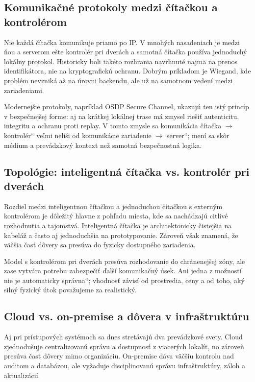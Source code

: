 \documentclass[journal,a4paper,onecolumn]{IEEEtran}
\newcommand{\uv}[1]{\quotedblbase#1\textquotedblleft}
\begin{document}
\subsection{Komunikačné protokoly medzi čítačkou a kontrolérom}

Nie každá čítačka komunikuje priamo po IP. V mnohých nasadeniach je medzi ňou a serverom ešte kontrolér pri dverách a samotná čítačka používa jednoduchý lokálny protokol. Historicky boli takéto rozhrania navrhnuté najmä na prenos identifikátora, nie na kryptografickú ochranu. Dobrým príkladom je Wiegand, kde problém nevzniká až na úrovni backendu, ale už na samotnom vedení medzi zariadeniami.

Modernejšie protokoly, napríklad OSDP Secure Channel, ukazujú ten istý princíp v bezpečnejšej forme: aj na krátkej lokálnej trase má zmysel riešiť autenticitu, integritu a ochranu proti replay. V tomto zmysle sa komunikácia \uv{čítačka $\rightarrow$ kontrolér} veľmi nelíši od komunikácie \uv{zariadenie $\rightarrow$ server}; mení sa skôr médium a prevádzkový kontext než samotná bezpečnostná logika.

\subsection{Topológie: inteligentná čítačka vs. kontrolér pri dverách}

Rozdiel medzi inteligentnou čítačkou a jednoduchou čítačkou s externým kontrolérom je dôležitý hlavne z pohľadu miesta, kde sa nachádzajú citlivé rozhodnutia a tajomstvá. Inteligentná čítačka je architektonicky čistejšia na kabeláž a často aj jednoduchšia na prototypovanie. Zároveň však znamená, že väčšia časť dôvery sa presúva do fyzicky dostupného zariadenia.

Model s kontrolérom pri dverách presúva rozhodovanie do chránenejšej zóny, ale zase vytvára potrebu zabezpečiť ďalší komunikačný úsek. Ani jedna z možností nie je automaticky \uv{správna}; vhodnosť závisí od prostredia, ceny a od toho, aký silný fyzický útok považujeme za realistický.

\subsection{Cloud vs. on-premise a dôvera v infraštruktúru}

Aj pri prístupových systémoch sa dnes stretávajú dva prevádzkové svety. Cloud zjednodušuje centralizovanú správu a dostupnosť z viacerých lokalít, no zároveň presúva časť dôvery mimo organizáciu. On-premise dáva väčšiu kontrolu nad auditom a databázou, ale vyžaduje disciplinovanú správu infraštruktúry, záloh a aktualizácií.
\end{document}
